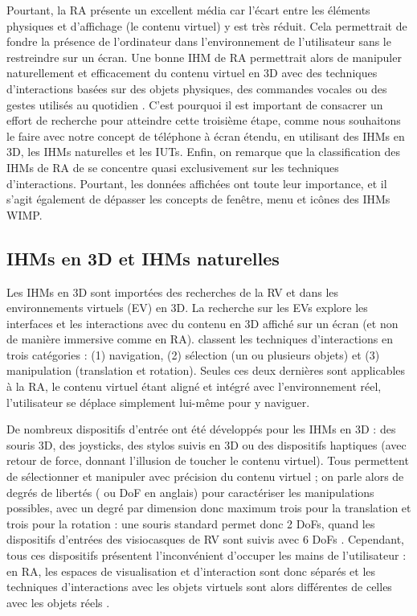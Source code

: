 Pourtant, la RA présente un excellent média car l'écart entre les éléments physiques et d'affichage (le contenu virtuel) y est très réduit. Cela permettrait de fondre la présence de l'ordinateur dans l'environnement de l'utilisateur sans le restreindre sur un écran. Une bonne IHM de RA permettrait alors de manipuler naturellement et efficacement du contenu virtuel en 3D avec des techniques d'interactions basées sur des objets physiques, des commandes vocales ou des gestes utilisés au quotidien \citep{Billinghurst2005}. C'est pourquoi il est important de consacrer un effort de recherche pour atteindre cette troisième étape, comme nous souhaitons le faire avec notre concept de téléphone à écran étendu, en utilisant des IHMs en 3D, les IHMs naturelles et les IUTs. Enfin, on remarque que la classification des IHMs de RA de \cite{Billinghurst2015} se concentre quasi exclusivement sur les techniques d'interactions. Pourtant, les données affichées ont toute leur importance, et il s'agit également de dépasser les concepts de fenêtre, menu et icônes des IHMs WIMP.

\subsection{IHMs en 3D et IHMs naturelles}
\label{subsec:litterature_ar_hci_interactions}
Les IHMs en 3D sont importées des recherches de la RV et dans les environnements virtuels (EV) en 3D. La recherche sur les EVs explore les interfaces et les interactions avec du contenu en 3D affiché sur un écran (et non de manière immersive comme en RA). \cite{Bowman2004} classent les techniques d'interactions en trois catégories : (1) navigation, (2) sélection (un ou plusieurs objets) et (3) manipulation (translation et rotation). Seules ces deux dernières sont applicables à la RA, le contenu virtuel étant aligné et intégré avec l'environnement réel, l'utilisateur se déplace simplement lui-même pour y naviguer.

De nombreux dispositifs d'entrée ont été développés pour les IHMs en 3D : des souris 3D, des joysticks, des stylos suivis en 3D ou des dispositifs haptiques (avec retour de force, donnant l'illusion de toucher le contenu virtuel). Tous permettent de sélectionner et manipuler avec précision du contenu virtuel ; on parle alors de degrés de libertés ( ou DoF en anglais) pour caractériser les manipulations possibles, avec un degré par dimension donc maximum trois pour la translation et trois pour la rotation : une souris standard permet donc 2 DoFs, quand les dispositifs d'entrées des visiocasques de RV sont suivis avec 6 DoFs . Cependant, tous ces dispositifs présentent l'inconvénient d'occuper les mains de l'utilisateur : en RA, les espaces de visualisation et d'interaction sont donc séparés  et les techniques d'interactions avec les objets virtuels sont alors différentes de celles avec les objets réels \cite{Billinghurst2015}.

